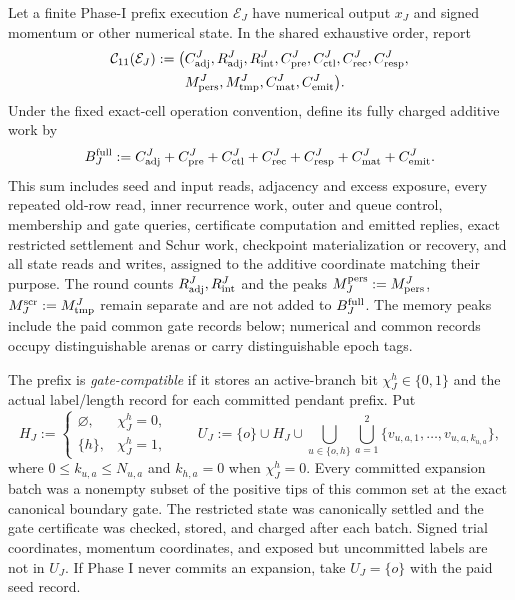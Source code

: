 \begin{definition}
\label{def:double-y-gate-compatible-prefix}
Let a finite Phase-I prefix execution $\mathcal E_J$ have numerical output
$x_J$ and signed momentum or other numerical state.  In the shared exhaustive
order, report
\begin{equation}
 \begin{aligned}
 \mathcal C_{11}(\mathcal E_J):=\bigl(&
 C_{\rm adj}^J,R_{\rm adj}^J,R_{\rm int}^J,C_{\rm pre}^J,C_{\rm ctl}^J,
 C_{\rm rec}^J,C_{\rm resp}^J,\\
 &M_{\rm pers}^J,M_{\rm tmp}^J,C_{\rm mat}^J,C_{\rm emit}^J\bigr).
 \end{aligned}
 \label{eq:double-y-composite-prefix-eleven-vector}
\end{equation}
Under the fixed exact-cell operation convention, define its fully charged
additive work by
\begin{equation}
 B_J^{\rm full}:=
 C_{\rm adj}^J+C_{\rm pre}^J+C_{\rm ctl}^J+C_{\rm rec}^J
 +C_{\rm resp}^J+C_{\rm mat}^J+C_{\rm emit}^J.
 \label{eq:double-y-composite-prefix-full-work}
\end{equation}
This sum includes seed and input reads, adjacency and excess exposure, every
repeated old-row read, inner recurrence work, outer and queue control,
membership and gate queries, certificate computation and emitted replies,
exact restricted settlement and Schur work, checkpoint materialization or
recovery, and all state reads and writes, assigned to the additive coordinate
matching their purpose.  The round counts $R_{\rm adj}^J,R_{\rm int}^J$ and
the peaks
$M_J^{\rm pers}:=M_{\rm pers}^J$, $M_J^{\rm scr}:=M_{\rm tmp}^J$ remain
separate and are not added to $B_J^{\rm full}$.  The memory peaks include the
paid common gate records below; numerical and common records occupy
distinguishable arenas or carry distinguishable epoch tags.

The prefix is \emph{gate-compatible} if it stores an active-branch bit
$\chi_J^h\in\{0,1\}$ and the actual label/length record for each committed
pendant prefix.  Put
\begin{equation}
 H_J:=
 \begin{cases}
  \varnothing,&\chi_J^h=0,\\
  \{h\},&\chi_J^h=1,
 \end{cases}
 \qquad
 U_J:=\{o\}\cup H_J\cup
 \bigcup_{u\in\{o,h\}}\bigcup_{a=1}^2
 \{v_{u,a,1},\ldots,v_{u,a,k_{u,a}}\},
 \label{eq:double-y-composite-prefix-state}
\end{equation}
where $0\leq k_{u,a}\leq N_{u,a}$ and $k_{h,a}=0$ when $\chi_J^h=0$.
Every committed expansion batch was a nonempty subset of the positive tips
of this common set at the exact canonical boundary gate.  The restricted
state was canonically settled and the gate certificate was checked, stored,
and charged after each batch.  Signed trial coordinates, momentum
coordinates, and exposed but uncommitted labels are not in $U_J$.  If Phase I
never commits an expansion, take $U_J=\{o\}$ with the paid seed record.
\end{definition}

